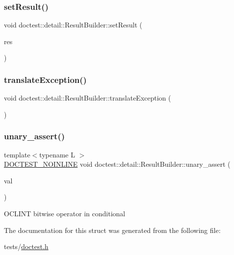 \mbox{\label{structdoctest_1_1detail_1_1ResultBuilder_a86c0ca727fead43263de4a7e9a59ad23}} 
\subsubsection{\texorpdfstring{set\+Result()}{setResult()}}
{\footnotesize\ttfamily void doctest\+::detail\+::\+Result\+Builder\+::set\+Result (\begin{DoxyParamCaption}\item[{const \hyperlink{structdoctest_1_1detail_1_1Result}{Result} \&}]{res }\end{DoxyParamCaption})}

\mbox{\label{structdoctest_1_1detail_1_1ResultBuilder_a5eece6aa3b1a2cb366cf5a0cc6c854a3}} 
\subsubsection{\texorpdfstring{translate\+Exception()}{translateException()}}
{\footnotesize\ttfamily void doctest\+::detail\+::\+Result\+Builder\+::translate\+Exception (\begin{DoxyParamCaption}{ }\end{DoxyParamCaption})}

\mbox{\label{structdoctest_1_1detail_1_1ResultBuilder_a98c33e90242e2859255a79cb38489f3b}} 
\subsubsection{\texorpdfstring{unary\+\_\+assert()}{unary\_assert()}}
{\footnotesize\ttfamily template$<$typename L $>$ \\
\hyperlink{doctest_8h_a47e9d3609dfcc90b9a630ff33b9524d6}{D\+O\+C\+T\+E\+S\+T\+\_\+\+N\+O\+I\+N\+L\+I\+NE} void doctest\+::detail\+::\+Result\+Builder\+::unary\+\_\+assert (\begin{DoxyParamCaption}\item[{const \hyperlink{doctest_8h_af2901cafb023c57fb672ccb1bf14f2eb}{D\+O\+C\+T\+E\+S\+T\+\_\+\+R\+E\+F\+\_\+\+W\+R\+AP}(L)}]{val }\end{DoxyParamCaption})\hspace{0.3cm}{\ttfamily [inline]}}

O\+C\+L\+I\+NT bitwise operator in conditional 

The documentation for this struct was generated from the following file\+:\begin{DoxyCompactItemize}
\item 
tests/\hyperlink{doctest_8h}{doctest.\+h}\end{DoxyCompactItemize}
